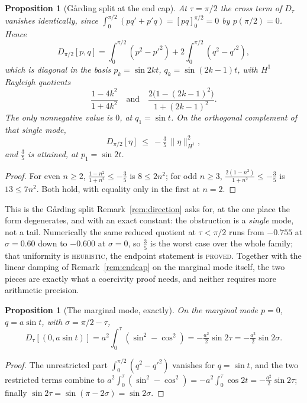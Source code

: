 \documentclass[11pt]{article}
\newtheorem{proposition}[theorem]{Proposition}
\theoremstyle{definition}
\begin{document}
\begin{proposition}[G\aa rding split at the end cap]\label{prop:garding}
At $\tau=\pi/2$ the cross term of $D_\tau$ vanishes identically, since
$\int_0^{\pi/2}(pq'+p'q)=[pq]_0^{\pi/2}=0$ by $p(\pi/2)=0$. Hence
\[
  D_{\pi/2}[p,q]=\int_0^{\pi/2}(p^2-p'^2)+2\int_0^{\pi/2}(q^2-q'^2) ,
\]
which is diagonal in the basis $p_k=\sin 2kt$, $q_k=\sin(2k-1)t$, with $H^1$ Rayleigh
quotients
\[
  \frac{1-4k^2}{1+4k^2}\quad\text{and}\quad\frac{2\bigl(1-(2k-1)^2\bigr)}{1+(2k-1)^2} .
\]
The only nonnegative value is $0$, at $q_1=\sin t$. On the orthogonal complement of that
single mode,
\[
  D_{\pi/2}[\eta]\ \le\ -\tfrac35\,\|\eta\|_{H^1}^2 ,
\]
and $\tfrac35$ is attained, at $p_1=\sin 2t$.
\end{proposition}

\begin{proof}
For even $n\ge2$, $\tfrac{1-n^2}{1+n^2}\le-\tfrac35$ is $8\le2n^2$; for odd $n\ge3$,
$\tfrac{2(1-n^2)}{1+n^2}\le-\tfrac35$ is $13\le7n^2$. Both hold, with equality only in the
first at $n=2$.
\end{proof}

This is the G\aa rding split Remark~\ref{rem:direction} asks for, at the one place the form
degenerates, and with an exact constant: the obstruction is a \emph{single} mode, not a
tail. Numerically the same reduced quotient at $\tau<\pi/2$ runs from $-0.755$ at
$\sigma=0.60$ down to $-0.600$ at $\sigma=0$, so $\tfrac35$ is the worst case over the whole
family; that uniformity is \textsc{heuristic}, the endpoint statement is \textsc{proved}.
Together with the linear damping of Remark~\ref{rem:endcap} on the marginal mode itself,
the two pieces are exactly what a coercivity proof needs, and neither requires more
arithmetic precision.

\begin{proposition}[The marginal mode, exactly]\label{prop:marginal}
On the marginal mode $p=0$, $q=a\sin t$, with $\sigma=\pi/2-\tau$,
\[
  D_\tau[(0,a\sin t)]
   = a^2\!\!\int_0^\tau\!(\sin^2-\cos^2)
   = -\tfrac{a^2}2\sin2\tau = -\tfrac{a^2}2\sin2\sigma .
\]
\end{proposition}

\begin{proof}
The unrestricted part $\int_0^{\pi/2}(q^2-q'^2)$ vanishes for $q=\sin t$, and the two
restricted terms combine to $a^2\int_0^\tau(\sin^2-\cos^2)=-a^2\int_0^\tau\cos2t
=-\tfrac{a^2}2\sin2\tau$; finally $\sin2\tau=\sin(\pi-2\sigma)=\sin2\sigma$.
\end{proof}
\end{document}
